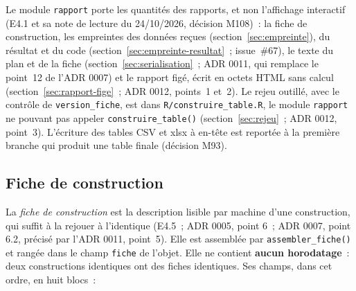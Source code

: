\documentclass[a4paper,11pt]{article}
\newcommand{\code}[1]{\texttt{\small #1}}
\begin{document}
Le module \code{rapport} porte les quantités des rapports, et non
l'affichage interactif (E4.1 et sa note de lecture du 24/10/2026, décision
M108)~: la fiche de construction, les empreintes des données reçues
(section~\ref{sec:empreinte}), du résultat et du code
(section~\ref{sec:empreinte-resultat}~; issue~\#67), le texte du plan et
de la fiche (section~\ref{sec:serialisation}~; ADR 0011, qui remplace le
point~12 de l'ADR 0007) et le rapport figé, écrit en octets HTML sans
calcul (section~\ref{sec:rapport-fige}~; ADR 0012, points~1 et~2). Le rejeu
outillé, avec le contrôle de \code{version\_fiche}, est dans
\code{R/construire\_table.R}, le module \code{rapport} ne pouvant pas
appeler \code{construire\_table()} (section~\ref{sec:rejeu}~; ADR 0012,
point~3). L'écriture des tables CSV et xlsx à en-tête est reportée à la
première branche qui produit une table finale (décision M93).

\subsection{Fiche de construction}
\label{sec:fiche}

La \emph{fiche de construction} est la description lisible par machine d'une
construction, qui suffit à la rejouer à l'identique (E4.5~; ADR 0005,
point 6~; ADR 0007, point 6.2, précisé par l'ADR 0011, point~5). Elle est assemblée par \code{assembler\_fiche()}
et rangée dans le champ \code{fiche} de l'objet. Elle ne contient
\textbf{aucun horodatage}~: deux constructions identiques ont des fiches
identiques. Ses champs, dans cet ordre, en huit blocs~:
\end{document}
